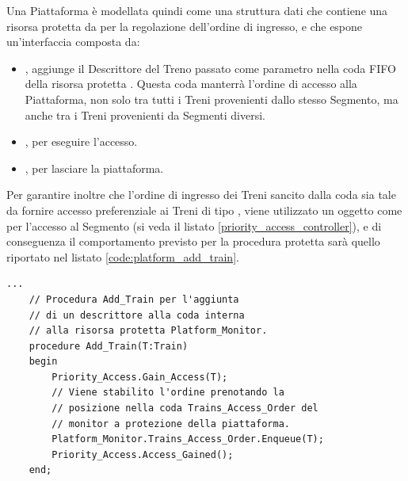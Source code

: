 \begin{description}
		Una Piattaforma è modellata quindi come una struttura dati che contiene una risorsa protetta da   per la regolazione dell'ordine di ingresso, e che espone un'interfaccia composta da:
		\begin{itemize}
			\item {}, aggiunge il Descrittore del Treno passato come parametro nella coda FIFO  della risorsa protetta . Questa coda manterrà l'ordine di accesso alla Piattaforma, non solo tra tutti i Treni provenienti dallo stesso Segmento, ma anche tra i Treni provenienti da Segmenti diversi.
			\item {}, per eseguire l'accesso.
			\item {}, per lasciare la piattaforma.
		\end{itemize}
		Per garantire inoltre che l'ordine di ingresso dei Treni sancito dalla coda  sia tale da fornire accesso preferenziale ai Treni di tipo , viene utilizzato un oggetto  come per l'accesso al Segmento (si veda il listato \ref{priority_access_controller}), e di conseguenza il comportamento previsto per la procedura protetta  sarà quello riportato nel listato \ref{code:platform_add_train}.
\begin{lstlisting}[caption=\small{Esempio di procedure \ttt{Add\_Train} per l'accesso alla Piattaforma.},label=code:platform_add_train]
	...
	// Procedura Add_Train per l'aggiunta
	// di un descrittore alla coda interna  
	// alla risorsa protetta Platform_Monitor.
	procedure Add_Train(T:Train)
	begin
		Priority_Access.Gain_Access(T);
		// Viene stabilito l'ordine prenotando la 
		// posizione nella coda Trains_Access_Order del
		// monitor a protezione della piattaforma.
		Platform_Monitor.Trains_Access_Order.Enqueue(T);
		Priority_Access.Access_Gained();
	end;
	

\end{lstlisting}
\end{description}
